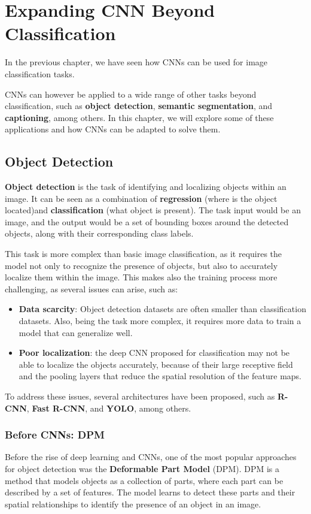 \section{Expanding CNN Beyond Classification}
In the previous chapter, we have seen how CNNs can be used for image classification tasks.

CNNs can however be applied to a wide range of other tasks beyond classification, such as \textbf{object detection}, 
\textbf{semantic segmentation}, and \textbf{captioning}, among others.
In this chapter, we will explore some of these applications and how CNNs can be adapted to solve them.

\subsection{Object Detection}
\textbf{Object detection} is the task of identifying and localizing objects within an image. It can be seen as a combination of
\textbf{regression} (where is the object located)and \textbf{classification} (what object is present).
The task input would be an image, and the output would be a set of bounding boxes around the detected objects, along with their corresponding class labels.

This task is more complex than basic image classification, as it requires the model not only to recognize the presence of objects, 
but also to accurately localize them within the image.
This makes also the training process more challenging, as several issues can arise, such as:
\begin{itemize}
    \item \textbf{Data scarcity}: Object detection datasets are often smaller than classification datasets. Also,
    being the task more complex, it requires more data to train a model that can generalize well.
    \item \textbf{Poor localization}: the deep CNN proposed for classification may not be able to localize the objects accurately, 
    because of their large receptive field and the pooling layers that reduce the spatial resolution of the feature maps.
\end{itemize}

To address these issues, several architectures have been proposed, such as \textbf{R-CNN}, \textbf{Fast R-CNN}, and \textbf{YOLO}, among others.

\subsubsection{Before CNNs: DPM}
Before the rise of deep learning and CNNs, one of the most popular approaches for object detection was the \textbf{Deformable Part Model} (DPM).
DPM is a method that models objects as a collection of parts, where each part can be described by a set of features. 
The model learns to detect these parts and their spatial relationships to identify the presence of an object in an image.

